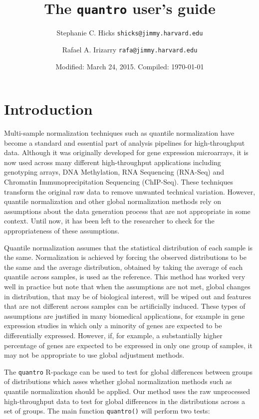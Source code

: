 \documentclass{article}\usepackage[]{graphicx}\usepackage[usenames,dvipsnames]{color}
\title{The \texttt{quantro} user's guide}
\author{Stephanie C. Hicks \texttt{shicks@jimmy.harvard.edu} \and
Rafael A. Irizarry \texttt{rafa@jimmy.harvard.edu} }
\date{Modified: March 24, 2015.  Compiled: \today}
\begin{document}
\maketitle
 
\tableofcontents

\section{Introduction}

Multi-sample normalization techniques such as quantile normalization 
\cite{Bolstad2003, Irizarry2003} have become a standard and essential part of 
analysis pipelines for high-throughput data. Although it was originally 
developed for gene expression microarrays, it is now used across many 
different high-throughput applications including genotyping arrays, DNA 
Methylation, RNA Sequencing (RNA-Seq) and Chromatin Immunoprecipitation 
Sequencing (ChIP-Seq). These techniques transform the original raw data to 
remove unwanted technical variation. However, quantile normalization and other 
global normalization methods rely on assumptions about the data generation 
process that are not appropriate in some context. Until now, it has been left 
to the researcher to check for the appropriateness of these assumptions. 

Quantile normalization assumes that the statistical distribution of each 
sample is the same. Normalization is achieved by forcing the observed 
distributions to be the same and the average distribution, obtained by taking 
the average of each quantile across samples, is used as the reference. This 
method has worked very well in practice but note that when the assumptions are 
not met, global changes in distribution, that may be of biological interest, 
will be wiped out and features that are not different across samples can be 
artificially induced.  These types of assumptions are justified in many 
biomedical applications, for example in gene expression studies in which only 
a minority of genes are expected to be differentially expressed. However, if, 
for example, a substantially higher percentage of genes are expected to be 
expressed in only one group of samples, it may not be appropriate to use 
global adjustment methods. 

The \texttt{quantro} R-package can be used to test for global differences 
between groups of distributions which asses whether global normalization 
methods such as quantile normalization should be applied. Our method uses 
the raw unprocessed high-throughput data to test for global differences in 
the distributions across a set of groups. The main function \texttt{quantro()} 
will perform two tests: 
\end{document}
